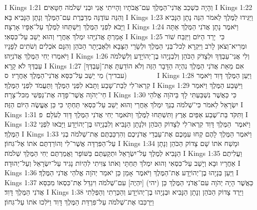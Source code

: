 I Kings 1:21	וְהָיָה כִּשְׁכַב אֲדֹנִי־הַמֶּלֶךְ עִם־אֲבֹתָיו וְהָיִיתִי אֲנִי וּבְנִי שְׁלֹמֹה חַטָּאִים׃
I Kings 1:22	וְהִנֵּה עוֹדֶנָּה מְדַבֶּרֶת עִם־הַמֶּלֶךְ וְנָתָן הַנָּבִיא בָּא׃
I Kings 1:23	וַיַּגִּידוּ לַמֶּלֶךְ לֵאמֹר הִנֵּה נָתָן הַנָּבִיא וַיָּבֹא לִפְנֵי הַמֶּלֶךְ וַיִּשְׁתַּחוּ לַמֶּלֶךְ עַל־אַפָּיו אָרְצָה׃
I Kings 1:24	וַיֹּאמֶר נָתָן אֲדֹנִי הַמֶּלֶךְ אַתָּה אָמַרְתָּ אֲדֹנִיָּהוּ יִמְלֹךְ אַחֲרָי וְהוּא יֵשֵׁב עַל־כִּסְאִי׃
I Kings 1:25	כִּי  יָרַד הַיּוֹם וַיִּזְבַּח שׁוֹר וּמְרִיא־וְצֹאן לָרֹב וַיִּקְרָא לְכל־בְּנֵי הַמֶּלֶךְ וּלְשָׂרֵי הַצָּבָא וּלְאֶבְיָתָר הַכֹּהֵן וְהִנָּם אֹכְלִים וְשֹׁתִים לְפָנָיו וַיֹּאמְרוּ יְחִי הַמֶּלֶךְ אֲדֹנִיָּהוּ׃
I Kings 1:26	וְלִי אֲנִי־עַבְדֶּךָ וּלְצָדֹק הַכֹּהֵן וְלִבְנָיָהוּ בֶן־יְהוֹיָדָע וְלִשְׁלֹמֹה עַבְדְּךָ לֹא קָרָא׃
I Kings 1:27	אִם מֵאֵת אֲדֹנִי הַמֶּלֶךְ נִהְיָה הַדָּבָר הַזֶּה וְלֹא הוֹדַעְתָּ אֶת־[עַבְדְּךָ] (עבדיך) מִי יֵשֵׁב עַל־כִּסֵּא אֲדֹנִי־הַמֶּלֶךְ אַחֲרָיו׃ {ס}        
I Kings 1:28	וַיַּעַן הַמֶּלֶךְ דָּוִד וַיֹּאמֶר קִרְאוּ־לִי לְבַת־שָׁבַע וַתָּבֹא לִפְנֵי הַמֶּלֶךְ וַתַּעֲמֹד לִפְנֵי הַמֶּלֶךְ׃
I Kings 1:29	וַיִּשָּׁבַע הַמֶּלֶךְ וַיֹּאמַר חַי־יְהֹוָה אֲשֶׁר־פָּדָה אֶת־נַפְשִׁי מִכּל־צָרָה׃
I Kings 1:30	כִּי כַּאֲשֶׁר נִשְׁבַּעְתִּי לָךְ בַּיהֹוָה אֱלֹהֵי יִשְׂרָאֵל לֵאמֹר כִּי־שְׁלֹמֹה בְנֵךְ יִמְלֹךְ אַחֲרַי וְהוּא יֵשֵׁב עַל־כִּסְאִי תַּחְתָּי כִּי כֵּן אֶעֱשֶׂה הַיּוֹם הַזֶּה׃
I Kings 1:31	וַתִּקֹּד בַּת־שֶׁבַע אַפַּיִם אֶרֶץ וַתִּשְׁתַּחוּ לַמֶּלֶךְ וַתֹּאמֶר יְחִי אֲדֹנִי הַמֶּלֶךְ דָּוִד לְעֹלָם׃ {פ}
I Kings 1:32	וַיֹּאמֶר  הַמֶּלֶךְ דָּוִד קִרְאוּ־לִי לְצָדוֹק הַכֹּהֵן וּלְנָתָן הַנָּבִיא וְלִבְנָיָהוּ בֶּן־יְהוֹיָדָע וַיָּבֹאוּ לִפְנֵי הַמֶּלֶךְ׃
I Kings 1:33	וַיֹּאמֶר הַמֶּלֶךְ לָהֶם קְחוּ עִמָּכֶם אֶת־עַבְדֵי אֲדֹנֵיכֶם וְהִרְכַּבְתֶּם אֶת־שְׁלֹמֹה בְנִי עַל־הַפִּרְדָּה אֲשֶׁר־לִי וְהוֹרַדְתֶּם אֹתוֹ אֶל־גִּחוֹן׃
I Kings 1:34	וּמָשַׁח אֹתוֹ שָׁם צָדוֹק הַכֹּהֵן וְנָתָן הַנָּבִיא לְמֶלֶךְ עַל־יִשְׂרָאֵל וּתְקַעְתֶּם בַּשּׁוֹפָר וַאֲמַרְתֶּם יְחִי הַמֶּלֶךְ שְׁלֹמֹה׃
I Kings 1:35	וַעֲלִיתֶם אַחֲרָיו וּבָא וְיָשַׁב עַל־כִּסְאִי וְהוּא יִמְלֹךְ תַּחְתָּי וְאֹתוֹ צִוִּיתִי לִהְיוֹת נָגִיד עַל־יִשְׂרָאֵל וְעַל־יְהוּדָה׃
I Kings 1:36	וַיַּעַן בְּנָיָהוּ בֶן־יְהוֹיָדָע אֶת־הַמֶּלֶךְ וַיֹּאמֶר  אָמֵן כֵּן יֹאמַר יְהֹוָה אֱלֹהֵי אֲדֹנִי הַמֶּלֶךְ׃
I Kings 1:37	כַּאֲשֶׁר הָיָה יְהֹוָה עִם־אֲדֹנִי הַמֶּלֶךְ כֵּן (יהי) [יִהְיֶה] עִם־שְׁלֹמֹה וִיגַדֵּל אֶת־כִּסְאוֹ מִכִּסֵּא אֲדֹנִי הַמֶּלֶךְ דָּוִד׃
I Kings 1:38	וַיֵּרֶד צָדוֹק הַכֹּהֵן וְנָתָן הַנָּבִיא וּבְנָיָהוּ בֶן־יְהוֹיָדָע וְהַכְּרֵתִי וְהַפְּלֵתִי וַיַּרְכִּבוּ אֶת־שְׁלֹמֹה עַל־פִּרְדַּת הַמֶּלֶךְ דָּוִד וַיֹּלִכוּ אֹתוֹ עַל־גִּחוֹן׃
